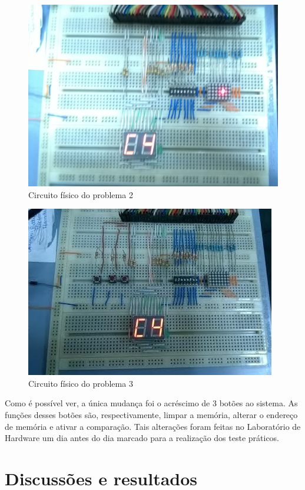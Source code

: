 \documentclass[12pt]{article}
\begin{document}
\begin{figure}[!htbp]
\centering
\includegraphics[width=.9\textwidth]{img/circuito-p2.jpg}
\caption{Circuito físico do problema 2}
\label{fig:circuito-p2}
\end{figure}

\begin{figure}[!htbp]
\centering
\begin{sideways}
\includegraphics[width=.6\textwidth]{img/circuito-p3.jpg}
\end{sideways}
\caption{Circuito físico do problema 3}
\label{fig:circuito-p3}
\end{figure}

Como é possível ver, a única mudança foi o acréscimo de 3 botões ao sistema. As funções desses botões são, respectivamente, limpar a memória, alterar o endereço de memória e ativar a comparação. Tais alterações foram feitas no Laboratório de Hardware um dia antes do dia marcado para a realização dos teste práticos.

\section{Discussões e resultados}
\end{document}
